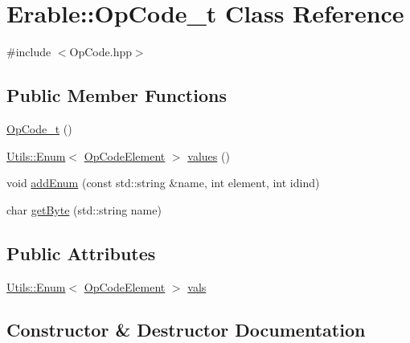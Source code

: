 \hypertarget{class_erable_1_1_op_code__t}{}\section{Erable\+::Op\+Code\+\_\+t Class Reference}
\label{class_erable_1_1_op_code__t}


{\ttfamily \#include $<$Op\+Code.\+hpp$>$}

\subsection*{Public Member Functions}
\begin{DoxyCompactItemize}
\item 
\mbox{\hyperlink{class_erable_1_1_op_code__t_a0016d63d45eae8a7ff0cd4dedd16fcb8}{Op\+Code\+\_\+t}} ()
\item 
\mbox{\hyperlink{class_erable_1_1_utils_1_1_enum}{Utils\+::\+Enum}}$<$ \mbox{\hyperlink{class_erable_1_1_op_code_element}{Op\+Code\+Element}} $>$ \mbox{\hyperlink{class_erable_1_1_op_code__t_a3af521f1bf56353a26915479aa122cd5}{values}} ()
\item 
void \mbox{\hyperlink{class_erable_1_1_op_code__t_a7075ff722bb9fa8b219315c2bf078358}{add\+Enum}} (const std\+::string \&name, int element, int idind)
\item 
char \mbox{\hyperlink{class_erable_1_1_op_code__t_a97081fa02af38bdf126a22cbf0345e3a}{get\+Byte}} (std\+::string name)
\end{DoxyCompactItemize}
\subsection*{Public Attributes}
\begin{DoxyCompactItemize}
\item 
\mbox{\hyperlink{class_erable_1_1_utils_1_1_enum}{Utils\+::\+Enum}}$<$ \mbox{\hyperlink{class_erable_1_1_op_code_element}{Op\+Code\+Element}} $>$ \mbox{\hyperlink{class_erable_1_1_op_code__t_ae2fe5eac3128b065de47103785ba8ea1}{vals}}
\end{DoxyCompactItemize}


\subsection{Constructor \& Destructor Documentation}
\mbox{\label{class_erable_1_1_op_code__t_a0016d63d45eae8a7ff0cd4dedd16fcb8}} 
